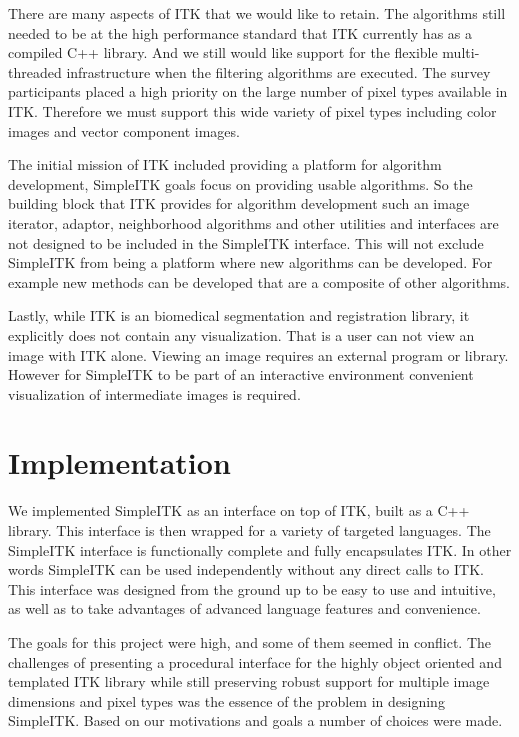 \documentclass{frontiersMED} %
\begin{document}
There are many aspects of ITK that we would like to retain. The
algorithms still needed to be at the high performance standard that
ITK currently has as a compiled C++ library. And we still would like
support for the flexible multi-threaded infrastructure when the
filtering algorithms are executed. The survey participants placed a
high priority on the large number of pixel types available in
ITK. Therefore we must support this wide variety of pixel types
including color images and vector component images.

The initial mission of ITK included providing a platform for algorithm
development, SimpleITK goals focus on providing usable algorithms. So
the building block that ITK provides for algorithm development such an
image iterator, adaptor, neighborhood algorithms and other utilities
and interfaces are not designed to be included in the SimpleITK
interface. This will not exclude SimpleITK from being a platform where
new algorithms can be developed. For example new methods can be
developed that are a composite of other algorithms.

Lastly, while ITK is an biomedical segmentation and registration
library, it explicitly does not contain any visualization. That is a
user can not view an image with ITK alone. Viewing an image requires
an external program or library. However for SimpleITK to be part of an
interactive environment convenient visualization of intermediate
images is required.

\section{Implementation}

We implemented SimpleITK as an interface on top of ITK, built as a C++
library. This interface is then wrapped for a variety of targeted
languages. The SimpleITK interface is functionally complete and fully
encapsulates ITK.  In other words SimpleITK can be used independently
without any direct calls to ITK. This interface was designed from the
ground up to be easy to use and intuitive, as well as to take
advantages of advanced language features and convenience.

The goals for this project were high, and some of them seemed in
conflict. The challenges of presenting a procedural interface for the
highly object oriented and templated ITK library while still
preserving robust support for multiple image dimensions and pixel
types was the essence of the problem in designing SimpleITK. Based on
our motivations and goals a number of choices were made.
\end{document}
